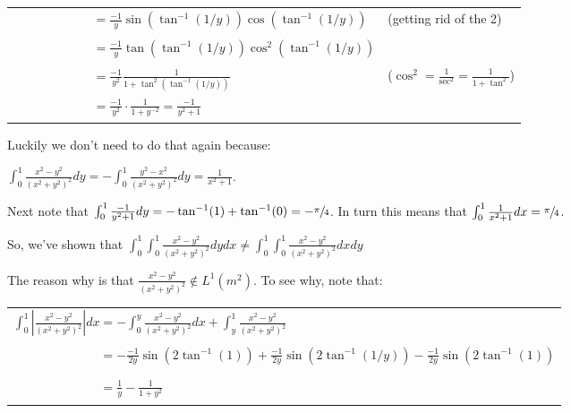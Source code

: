 \documentclass{book}
\newcommand{\exPP}{%
   \color{RedViolet}%
   \fontsize{12}{14}\selectfont%
}
\newcommand{\exPPP}{%
   \color{VioletRed}%
   \fontsize{12}{14}\selectfont%
}
\newenvironment{myIndent}{%
   \begin{adjustwidth}{2.5em}{0em}%
}{%
   \end{adjustwidth}%
}
\newcommand{\retTwo}{\hfill\bigbreak}
\begin{document}
\begin{enumerate}
\begin{myIndent}
{\begin{tabular}{l l}
			$\phantom{\int_0^1 \frac{x^2 - y^2}{(x^2 + y^2)^2}dx} = \frac{-1}{y}\sin(\tan^{-1}(1/y))\cos(\tan^{-1}(1/y))$ & {\exPPP (getting rid of the 2)}\\ [8pt]

			$\phantom{\int_0^1 \frac{x^2 - y^2}{(x^2 + y^2)^2}dx} = \frac{-1}{y}\tan(\tan^{-1}(1/y))\cos^2(\tan^{-1}(1/y))$\\ [8pt]

			$\phantom{\int_0^1 \frac{x^2 - y^2}{(x^2 + y^2)^2}dx} = \frac{-1}{y^2}\frac{1}{1 + \tan^2(\tan^{-1}(1/y))}$ & {\exPPP ($\cos^2 = \frac{1}{\sec^2} = \frac{1}{1 + \tan^2}$)}\\ [8pt]

			$\phantom{\int_0^1 \frac{x^2 - y^2}{(x^2 + y^2)^2}dx} = \frac{-1}{y^2} \cdot \frac{1}{1 + y^{-2}} = \frac{-1}{y^2 + 1}$
		\end{tabular} \retTwo\par}

		Luckily we don't need to do that again because:
		
		{\centering $\int_0^1 \frac{x^2 - y^2}{(x^2 + y^2)^2}dy = -\int_0^1 \frac{y^2 - x^2}{(x^2 + y^2)^2}dy = \frac{1}{x^2 + 1}$.\retTwo\par}

		Next note that $\int_0^1 \frac{-1}{y^2 + 1}dy = -\tan^{-1}(1) + \tan^{-1}(0) = -\sfrac{\pi}{4}$. In turn this means that $\int_0^1 \frac{1}{x^2 + 1}dx = \sfrac{\pi}{4}$.\retTwo

		So, we've shown that $\int_0^1 \int_0^1 \frac{x^2 - y^2}{(x^2 + y^2)^2}dydx \neq \int_0^1 \int_0^1 \frac{x^2 - y^2}{(x^2 + y^2)^2}dxdy$\newpage

		The reason why is that $\frac{x^2 - y^2}{(x^2 + y^2)^2} \notin L^1(m^2)$. To see why, note that:
		
		{\centering\exPP
		\begin{tabular}{l}
			$\int_0^1 \left|\frac{x^2 - y^2}{(x^2 + y^2)^2}\right|dx = -\int_0^y \frac{x^2 - y^2}{(x^2 + y^2)^2}dx + \int_y^1\frac{x^2 - y^2}{(x^2 + y^2)^2}$\\ [8pt]

			$\phantom{\int_0^1 \left|\frac{x^2 - y^2}{(x^2 + y^2)^2}\right|dx} = -\frac{-1}{2y}\sin(2\tan^{-1}(1)) + \frac{-1}{2y}\sin(2\tan^{-1}(1/y)) -\frac{-1}{2y}\sin(2\tan^{-1}(1))$\\ [8pt]

			$\phantom{\int_0^1 \left|\frac{x^2 - y^2}{(x^2 + y^2)^2}\right|dx} = \frac{1}{y} - \frac{1}{1 + y^2}$\\ [8pt]
		\end{tabular}\retTwo\par}


\end{myIndent}
\end{enumerate}
\end{document}
